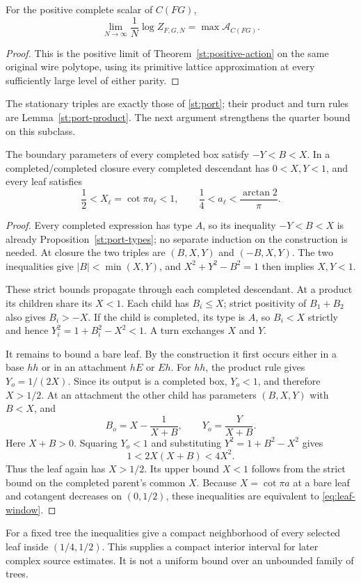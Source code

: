 \begin{corollary}\label{cor:complete-limit}
For the positive complete scalar of $C(FG)$,
\[
 \lim_{N\to\infty}\frac1N\log Z_{F,G,N}
       =\max\mathcal A_{C(FG)}.
\]
\end{corollary}
\begin{proof}
This is the positive limit of Theorem~\ref{st:positive-action}
on the same original wire polytope, using its primitive lattice
approximation at every sufficiently large level of either parity.
\end{proof}

The stationary triples are exactly those of \eqref{st:port};
their product and turn rules are Lemma~\ref{st:port-product}.
The next argument strengthens the quarter bound on this subclass.

\begin{lemma}\label{lem:port-bounds}
The boundary parameters of every completed box satisfy $-Y<B<X$. In a completed/completed closure every completed descendant has $0<X,Y<1$, and every leaf satisfies
\begin{equation}\label{eq:leaf-window}
 \frac12<X_\ell=\cot\pi a_\ell<1,
 \qquad \frac14<a_\ell<\frac{\arctan2}{\pi}.
\end{equation}
\end{lemma}
\begin{proof}
Every completed expression has type $A$, so its inequality
$-Y<B<X$ is already Proposition~\ref{st:port-types}; no separate
induction on the construction is needed. At closure the two triples
are $(B,X,Y)$ and $(-B,X,Y)$. The two inequalities give
$|B|<\min(X,Y)$, and $X^2+Y^2-B^2=1$ then implies $X,Y<1$.

These strict bounds propagate through each completed descendant.
At a product its children share its $X<1$. Each child has $B_i\le X$;
strict positivity of $B_1+B_2$ also gives $B_i>-X$. If the child is
completed, its type is $A$, so $B_i<X$ strictly and hence
$Y_i^2=1+B_i^2-X^2<1$. A turn exchanges $X$ and $Y$.

It remains to bound a bare leaf. By the construction it first occurs
either in a base $hh$ or in an attachment $hE$ or $Eh$. For $hh$,
the product rule gives $Y_o=1/(2X)$. Since its output is a completed
box, $Y_o<1$, and therefore $X>1/2$. At an attachment the other
child has parameters $(B,X,Y)$ with $B<X$, and
\[
 B_o=X-\frac1{X+B},\qquad Y_o=\frac{Y}{X+B}.
\]
Here $X+B>0$. Squaring $Y_o<1$ and substituting
$Y^2=1+B^2-X^2$ gives
\[
 1<2X(X+B)<4X^2.
\]
Thus the leaf again has $X>1/2$. Its upper bound $X<1$ follows
from the strict bound on the completed parent's common $X$.
Because $X=\cot\pi a$ at a bare leaf and cotangent decreases
on $(0,1/2)$, these inequalities are equivalent to
\eqref{eq:leaf-window}.
\end{proof}

For a fixed tree the inequalities give a compact neighborhood of every selected leaf inside $(1/4,1/2)$. This supplies a compact interior interval for later complex source estimates. It is not a uniform bound over an unbounded family of trees.

